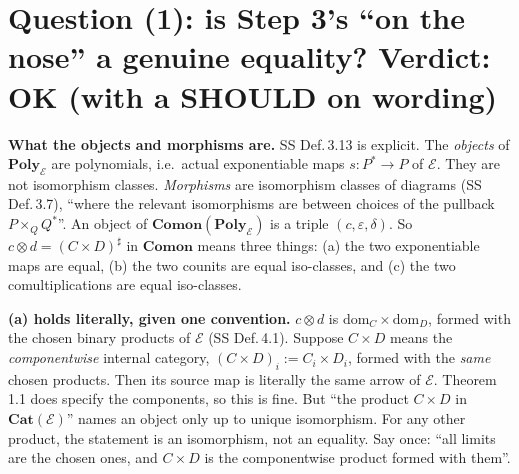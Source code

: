 \documentclass[10pt]{amsart}
\newcommand{\Poly}{\mathbf{Poly}}
\newcommand{\Cat}{\mathbf{Cat}}
\newcommand{\Comon}{\mathbf{Comon}}
\newcommand{\E}{\mathcal{E}}
\begin{document}
\section{Question (1): is Step 3's ``on the nose'' a genuine equality? Verdict: OK (with a SHOULD on wording)}

\textbf{What the objects and morphisms are.} SS Def.\,3.13 is explicit. The \emph{objects} of $\Poly_\E$ are
polynomials, i.e.\ actual exponentiable maps $s\colon P^*\to P$ of $\E$. They are not isomorphism classes.
\emph{Morphisms} are isomorphism classes of diagrams (SS Def.\,3.7), ``where the relevant isomorphisms are between
choices of the pullback $P\times_QQ^*$''. An object of $\Comon(\Poly_\E)$ is a triple $(c,\varepsilon,\delta)$. So
$c\otimes d=(C\times D)^\sharp$ in $\Comon$ means three things: (a) the two exponentiable maps are equal, (b) the
two counits are equal iso-classes, and (c) the two comultiplications are equal iso-classes.

\textbf{(a) holds literally, given one convention.} $c\otimes d$ is $\mathrm{dom}_C\times\mathrm{dom}_D$, formed
with the chosen binary products of $\E$ (SS Def.\,4.1). Suppose $C\times D$ means the \emph{componentwise} internal
category, $(C\times D)_i:=C_i\times D_i$, formed with the \emph{same} chosen products. Then its source map is
literally the same arrow of $\E$. Theorem 1.1 does specify the components, so this is fine. But ``the product
$C\times D$ in $\Cat(\E)$'' names an object only up to unique isomorphism. For any other product, the statement is
an isomorphism, not an equality. Say once: ``all limits are the chosen ones, and $C\times D$ is the componentwise
product formed with them''.
\end{document}
